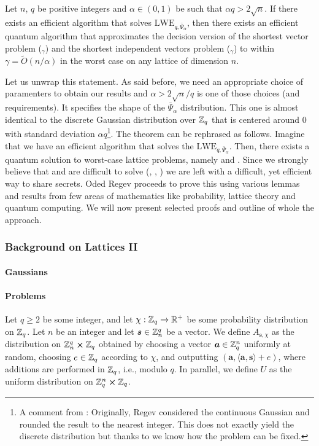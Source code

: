 \begin{theorem}\label{main}
	Let $n$, $q$ be positive integers and $\alpha \in (0, 1)$ be such that $\alpha q > 2 \sqrt{n}$. If there exists an efficient algorithm that solves $\text{LWE}_{q, \bar{\Psi}_{\alpha}}$, then there exists an efficient quantum algorithm that approximates the decision version of the shortest vector problem ($_{\gamma}$) and the shortest independent vectors problem ($_{\gamma}$) to within $\gamma = \tilde{O}(n/\alpha)$ in the worst case on any lattice of dimension $n$.	
\end{theorem}

Let us unwrap this statement. As said before, we need an appropriate choice of paramenters to obtain our results and $\alpha > 2\sqrt{n}/q$ is one of those choices (and requirements). It specifies the shape of the $\bar{\Psi}_{\alpha}$ distribution. This one is almost identical to the discrete Gaussian distribution over $\mathbb{Z}_q$ that is centered around 0 with standard deviation $\alpha q$\footnote{A comment from \cite{lattice-survey}: Originally, Regev considered the continuous Gaussian and rounded the result to the nearest integer. This does not exactly yield the discrete distribution but thanks to \cite{discr} we know how the problem can be fixed.}. The theorem can be rephrased as follows. Imagine that we have an efficient algorithm that solves the $\text{LWE}_{q, \bar{\Psi}_{\alpha}}$. Then, there exists a quantum solution to worst-case lattice problems, namely  and . Since we strongly believe that  and  are difficult to solve (\cite{svp-hard}, \cite{reductions}, \cite{cvp-hard}) we are left with a difficult, yet efficient way to share secrets. Oded Regev proceeds to prove this using various lemmas and results from few areas of mathematics like probability, lattice theory and quantum computing. We will now present selected proofs and outline of whole the approach.

\subsubsection{Background on Lattices II}
\paragraph{Gaussians}
\paragraph{Problems}
\begin{definition}\label{lwe-distr}
    Let $q \geq 2$ be some integer, and let $\chi : \mathbb{Z}_q \rightarrow \mathbb{R}^+$ be some probability distribution on $\mathbb{Z}_q$. Let $n$ be an integer and let $\boldsymbol{s} \in \mathbb{Z}_n^q$ be a vector. We define $A_{\bm{s},\chi}$ as the distribution on $\mathbb{Z}_n^q \cross \mathbb{Z}_q$ obtained by choosing a vector $\boldsymbol{a} \in \mathbb{Z}_q^n$ uniformly at random, choosing $e \in \mathbb{Z}_q$ according to $\chi$, and outputting $(\bm{a}, \langle \bm{a}, \bm{s} \rangle + e)$, where additions are performed in $\mathbb{Z}_q$, i.e., modulo $q$. In parallel, we define $U$ as the uniform distribution on $\mathbb{Z}_q^n \cross \mathbb{Z}_q$.
\end{definition}
